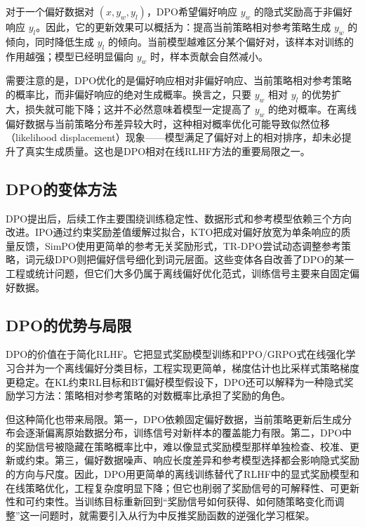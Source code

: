 对于一个偏好数据对 $(x,y_w,y_l)$，DPO希望偏好响应 $y_w$ 的隐式奖励高于非偏好响应 $y_l$。因此，它的更新效果可以概括为：提高当前策略相对参考策略生成 $y_w$ 的倾向，同时降低生成 $y_l$ 的倾向。当前模型越难区分某个偏好对，该样本对训练的作用越强；模型已经明显偏向 $y_w$ 时，样本贡献会自然减小。

需要注意的是，DPO优化的是偏好响应相对非偏好响应、当前策略相对参考策略的概率比，而非偏好响应的绝对生成概率。换言之，只要 $y_w$ 相对 $y_l$ 的优势扩大，损失就可能下降；这并不必然意味着模型一定提高了 $y_w$ 的绝对概率。在离线偏好数据与当前策略分布差异较大时，这种相对概率优化可能导致似然位移（likelihood displacement）现象——模型满足了偏好对上的相对排序，却未必提升了真实生成质量\cite{azar2024general}。这也是DPO相对在线RLHF方法的重要局限之一。


\subsection{DPO的变体方法}

DPO提出后，后续工作主要围绕训练稳定性、数据形式和参考模型依赖三个方向改进。IPO\cite{azar2024general}通过约束奖励差值缓解过拟合，KTO\cite{ethayarajh2024kto}把成对偏好放宽为单条响应的质量反馈，SimPO\cite{meng2024simpo}使用更简单的参考无关奖励形式，TR-DPO\cite{gorbatovski2025trdpo}尝试动态调整参考策略，词元级DPO\cite{zeng2024token}则把偏好信号细化到词元层面。这些变体各自改善了DPO的某一工程或统计问题，但它们大多仍属于离线偏好优化范式，训练信号主要来自固定偏好数据。

\subsection{DPO的优势与局限}

DPO的价值在于简化RLHF。它把显式奖励模型训练和PPO/GRPO式在线强化学习合并为一个离线偏好分类目标，工程实现更简单，梯度估计也比采样式策略梯度更稳定。在KL约束RL目标和BT偏好模型假设下，DPO还可以解释为一种隐式奖励学习方法：策略相对参考策略的对数概率比承担了奖励的角色。

但这种简化也带来局限。第一，DPO依赖固定偏好数据，当前策略更新后生成分布会逐渐偏离原始数据分布，训练信号对新样本的覆盖能力有限\cite{tajwar2024preference}。第二，DPO中的奖励信号被隐藏在策略概率比中，难以像显式奖励模型那样单独检查、校准、更新或约束。第三，偏好数据噪声、响应长度差异和参考模型选择都会影响隐式奖励的方向与尺度\cite{azar2024general,meng2024simpo}。因此，DPO用更简单的离线训练替代了RLHF中的显式奖励模型和在线策略优化，工程复杂度明显下降；但它也削弱了奖励信号的可解释性、可更新性和可约束性。当训练目标重新回到“奖励信号如何获得、如何随策略变化而调整”这一问题时，就需要引入从行为中反推奖励函数的逆强化学习框架。

